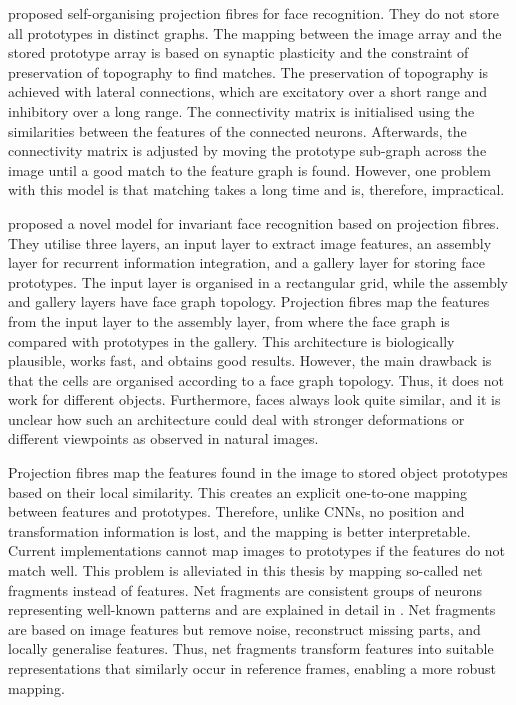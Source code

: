  proposed self-organising projection fibres for face recognition. They do not store all prototypes in distinct graphs. The mapping between the image array and the stored prototype array is based on synaptic plasticity and the constraint of preservation of topography to find matches. The preservation of topography is achieved with lateral connections, which are excitatory over a short range and inhibitory over a long range.
The connectivity matrix is initialised using the similarities between the features of the connected neurons. Afterwards, the connectivity matrix is adjusted by moving the prototype sub-graph across the image until a good match to the feature graph is found.
However, one problem with this model is that matching takes a long time and is, therefore, impractical.

 proposed a novel model for invariant face recognition based on projection fibres.
They utilise three layers, an input layer to extract image features, an assembly layer for recurrent information integration, and a gallery layer for storing face prototypes.
The input layer is organised in a rectangular grid, while the assembly and gallery layers have face graph topology.
Projection fibres map the features from the input layer to the assembly layer, from where the face graph is compared with prototypes in the gallery.
This architecture is biologically plausible, works fast, and obtains good results. 
However, the main drawback is that the cells are organised according to a face graph topology. Thus, it does not work for different objects. Furthermore, faces always look quite similar, and it is unclear how such an architecture could deal with stronger deformations or different viewpoints as observed in natural images.

Projection fibres map the features found in the image to stored object prototypes based on their local similarity. This creates an explicit one-to-one mapping between features and prototypes. Therefore, unlike CNNs, no position and transformation information is lost, and the mapping is better interpretable.
Current implementations cannot map images to prototypes if the features do not match well.
This problem is alleviated in this thesis by mapping so-called net fragments instead of features.
Net fragments are consistent groups of neurons representing well-known patterns and are explained in detail in .
Net fragments are based on image features but remove noise, reconstruct missing parts, and locally generalise features. Thus, net fragments transform features into suitable representations that similarly occur in reference frames, enabling a more robust mapping.

